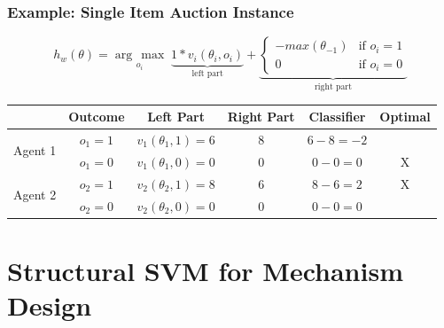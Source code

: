 \documentclass{beamer}
\newcommand{\argmax}[1]{\underset{#1}{\operatorname{arg}\,\operatorname{max}}\;}
\newcommand\Tstrut{\rule{0pt}{2.6ex}}         %
\begin{document}
\begin{frame}
	\frametitle{Example: Single Item Auction Instance}

	\begin{equation*}
	h_{w}(\theta) = \argmax{o_{i}} \underbrace{1 * v_{i}(\theta_{i},o_{i})}_{\text{left part}} +
	\underbrace{\begin{cases}
	- max(\theta_{-1})& \text{if } o_{i} = 1\\
	0              & \text{if } o_{i} = 0
	\end{cases}}_{\text{right part}}
	\end{equation*}
	\pause
	\bigskip
	{\small
		\begin{center}
	\begin{tabular}{c c c c c c}
		\toprule
		& \textbf{Outcome} & \textbf{Left Part} & \textbf{Right Part} & \textbf{Classifier} & \textbf{Optimal} \Tstrut \\ 
		\midrule 
		\multirow{2}{*}{Agent 1} 	&$o_{1}=1$	\pause[3]	& 	$v_{1}(\theta_{1},1) = 6$ \pause[4]	& 8	\pause[5]&$6 - 8 = -2$ \pause[6] &	\Tstrut \\
		\pause[2]&$o_{1}=0$	\pause[3] &	$v_{1}(\theta_{1},0) = 0$\pause[4]	& 0	\pause[5]&$0 - 0 = 0$ \pause[6]&X	\Tstrut\pause[2]\\ 
		\midrule 
		\multirow{2}{*}{Agent 2}  	&$o_{2}=1$ \pause[3]	&	$v_{2}(\theta_{2},1) = 8$	\pause[4]& 6\pause[5]	&$8-6 = 2$	\pause[6]&X	\Tstrut \\	
		\pause[2]&$o_{2}=0$	 \pause[3]	&	$v_{2}(\theta_{2},0) = 0$\pause[4]	& 0\pause[5]	&$0 - 0 = 0$ \pause[6]& \Tstrut \pause[2]\\ 
		\bottomrule 
	\end{tabular}
	\end{center}}
\end{frame}


\section{Structural SVM for Mechanism Design}
\end{document}
